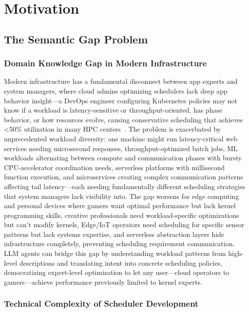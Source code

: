 \section{Motivation}

\subsection{The Semantic Gap Problem}

\subsubsection{Domain Knowledge Gap in Modern Infrastructure}

Modern infrastructure has a fundamental disconnect between app experts and system managers, where cloud admins optimizing schedulers lack deep app behavior insight—a DevOps engineer configuring Kubernetes policies may not know if a workload is latency-sensitive or throughput-oriented, has phase behavior, or how resources evolve, causing conservative scheduling that achieves <50\% utilization in many HPC centers~\cite{feitelson2023utilization}. The problem is exacerbated by unprecedented workload diversity: one machine might run latency-critical web services needing microsecond responses, throughput-optimized batch jobs, ML workloads alternating between compute and communication phases with bursty CPU-accelerator coordination needs, serverless platforms with millisecond function execution, and microservices creating complex communication patterns affecting tail latency—each needing fundamentally different scheduling strategies that system managers lack visibility into. The gap worsens for edge computing and personal devices where gamers want optimal performance but lack kernel programming skills, creative professionals need workload-specific optimizations but can't modify kernels, Edge/IoT operators need scheduling for specific sensor patterns but lack systems expertise, and serverless abstraction layers hide infrastructure completely, preventing scheduling requirement communication. LLM agents can bridge this gap by understanding workload patterns from high-level descriptions and translating intent into concrete scheduling policies, democratizing expert-level optimization to let any user—cloud operators to gamers—achieve performance previously limited to kernel experts.

\subsubsection{Technical Complexity of Scheduler Development}

